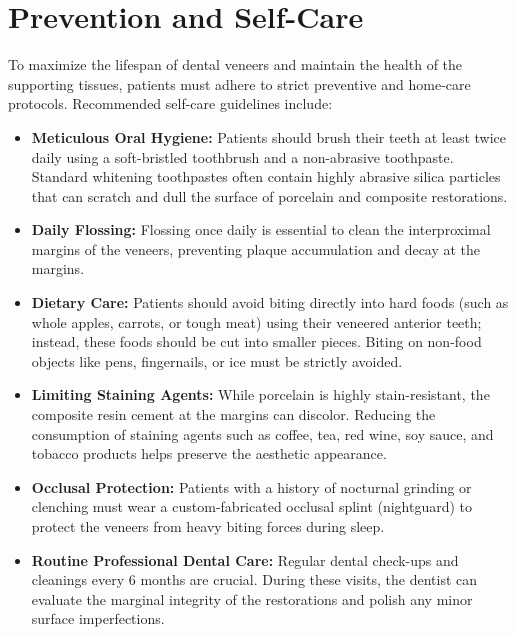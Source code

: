 \section*{Prevention and Self-Care}
To maximize the lifespan of dental veneers and maintain the health of the supporting tissues, patients must adhere to strict preventive and home-care protocols. Recommended self-care guidelines include:
\begin{itemize}
    \item \textbf{Meticulous Oral Hygiene:} Patients should brush their teeth at least twice daily using a soft-bristled toothbrush and a non-abrasive toothpaste. Standard whitening toothpastes often contain highly abrasive silica particles that can scratch and dull the surface of porcelain and composite restorations.
    \item \textbf{Daily Flossing:} Flossing once daily is essential to clean the interproximal margins of the veneers, preventing plaque accumulation and decay at the margins.
    \item \textbf{Dietary Care:} Patients should avoid biting directly into hard foods (such as whole apples, carrots, or tough meat) using their veneered anterior teeth; instead, these foods should be cut into smaller pieces. Biting on non-food objects like pens, fingernails, or ice must be strictly avoided.
    \item \textbf{Limiting Staining Agents:} While porcelain is highly stain-resistant, the composite resin cement at the margins can discolor. Reducing the consumption of staining agents such as coffee, tea, red wine, soy sauce, and tobacco products helps preserve the aesthetic appearance.
    \item \textbf{Occlusal Protection:} Patients with a history of nocturnal grinding or clenching must wear a custom-fabricated occlusal splint (nightguard) to protect the veneers from heavy biting forces during sleep.
    \item \textbf{Routine Professional Dental Care:} Regular dental check-ups and cleanings every 6 months are crucial. During these visits, the dentist can evaluate the marginal integrity of the restorations and polish any minor surface imperfections.
\end{itemize}

